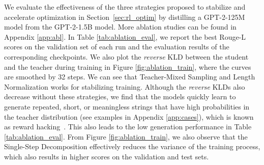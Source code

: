 \documentclass{article}
\begin{document}
We evaluate the effectiveness of the three strategies proposed to stabilize and accelerate optimization in Section~\ref{sec:rl_optim} by distilling a GPT-2-125M model from the GPT-2-1.5B model. More ablation studies can be found in Appendix \ref{app:abl}. In Table \ref{tab:ablation_eval}, we report the best Rouge-L scores on the validation set of each run and the evaluation results of the corresponding checkpoints. We also plot the \textit{reverse} KLD between the student and the teacher during training in Figure \ref{fig:ablation_train}, where the curves are smoothed by 32 steps. We can see that Teacher-Mixed Sampling and Length Normalization works for stabilizing training. Although the \textit{reverse} KLDs also decrease without these strategies, we find that the models quickly learn to generate repeated, short, or meaningless strings that have high probabilities in the teacher distribution (see examples in Appendix \ref{app:cases}), which is known as reward hacking~\citep{reward_hacking}. This also leads to the low generation performance in Table \ref{tab:ablation_eval}. From Figure \ref{fig:ablation_train}, we also observe that the Single-Step Decomposition effectively reduces the variance of the training process, which also results in higher scores on the validation and test sets.
\end{document}

